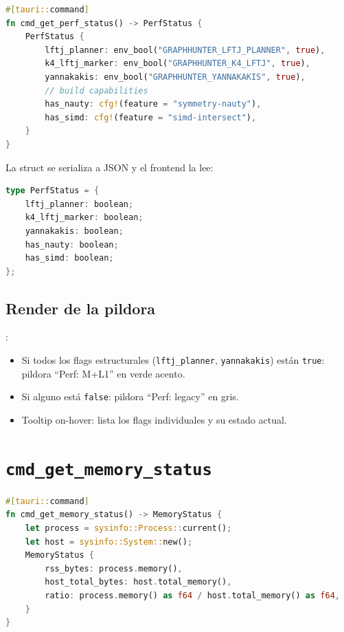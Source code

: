 \begin{lstlisting}[language=Rust]
#[tauri::command]
fn cmd_get_perf_status() -> PerfStatus {
    PerfStatus {
        lftj_planner: env_bool("GRAPHHUNTER_LFTJ_PLANNER", true),
        k4_lftj_marker: env_bool("GRAPHHUNTER_K4_LFTJ", true),
        yannakakis: env_bool("GRAPHHUNTER_YANNAKAKIS", true),
        // build capabilities
        has_nauty: cfg!(feature = "symmetry-nauty"),
        has_simd: cfg!(feature = "simd-intersect"),
    }
}
\end{lstlisting}

\noindent
La struct se serializa a JSON y el frontend la lee:

\begin{lstlisting}[language=Rust]
type PerfStatus = {
    lftj_planner: boolean;
    k4_lftj_marker: boolean;
    yannakakis: boolean;
    has_nauty: boolean;
    has_simd: boolean;
};
\end{lstlisting}

\subsection{Render de la pildora}

:

\begin{itemize}
    \item Si todos los flags estructurales (\texttt{lftj\_planner},
    \texttt{yannakakis}) están \texttt{true}: pildora ``Perf: M+L1''
    en verde acento.
    \item Si alguno está \texttt{false}: pildora ``Perf: legacy''
    en gris.
    \item Tooltip on-hover: lista los flags individuales y su
    estado actual.
\end{itemize}

\section{\texttt{cmd\_get\_memory\_status}}

\begin{lstlisting}[language=Rust]
#[tauri::command]
fn cmd_get_memory_status() -> MemoryStatus {
    let process = sysinfo::Process::current();
    let host = sysinfo::System::new();
    MemoryStatus {
        rss_bytes: process.memory(),
        host_total_bytes: host.total_memory(),
        ratio: process.memory() as f64 / host.total_memory() as f64,
    }
}
\end{lstlisting}


